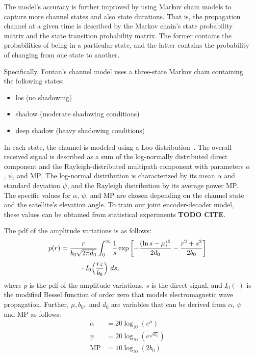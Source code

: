 \documentclass[conference]{IEEEtran}
\newcommand\MP{\ensuremath{\mathrm{MP}}\xspace}
\begin{document}
The model's accuracy is further improved by using Markov chain models to capture more channel states and also state durations.
That is, the propagation channel at a given time is described by the Markov chain's state probability matrix and the state transition probability matrix.
The former contains the probabilities of being in a particular state, and the latter contains the probability of changing from one state to another.

Specifically, Fontan's channel model \cite{966585} uses a three-state Markov chain containing the following states:
%
\begin{itemize}
  \item \ac{los} (no shadowing)
  \item shadow (moderate shadowing conditions)
  \item deep shadow (heavy shadowing conditions)
\end{itemize}
%
In each state, the channel is modeled using a Loo distribution~\cite{1623307}. 
The overall received signal is described as a sum of the log-normally distributed direct component and the Rayleigh-distributed multipath component with parameters $\alpha$, $\psi$, and \MP.
The log-normal distribution is characterized by its mean $\alpha$ and standard deviation $\psi$, and the Rayleigh distribution by its average power \MP.
The specific values for $\alpha$, $\psi$, and \MP are chosen depending on the channel state and the satellite's elevation angle.
To train our joint encoder-decoder model, these values can be obtained from statistical experiments \textbf{TODO CITE}.

The \ac{pdf} of the amplitude variations is as follows:
\begin{align}
  p(r) &= \frac{r}{b_0\sqrt{2\pi d_0}} \nonumber
  \int_{0}^{\infty}\frac{1}{s} \exp\left[-\frac{(\ln s - \mu)^2}{2d_0} - \frac{r^2 + s^2}{2b_0}\right] \\[1ex]
  &\hphantom{=\int_{0}^{\infty}} \cdot I_0\Big(\frac{rz}{b_0}\Big)\ ds,
\end{align}
%
where $p$ is the \ac{pdf} of the amplitude variations, $s$ is the direct signal, and $I_0(\cdot)$ is the modified Bessel function of order zero that models electromagnetic wave propagation.
Further, $\mu, b_0,$ and $d_0$ are variables that can be derived from $\alpha$, $\psi$ and \MP as follows:
%
\begin{align}
\alpha &= 20\log_{10}(e^\mu) \\
  \psi &= 20\log_{10}(e^{\sqrt{d_0}}) \\
   \MP &= 10\log_{10}(2b_0)
\end{align}
\end{document}
